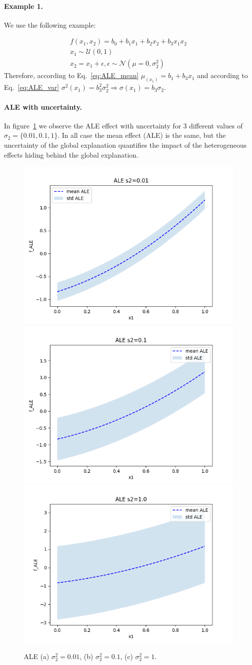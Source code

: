 \documentclass{article}
\begin{document}
\paragraph{Example 1.} We use the following example:

\begin{equation}
  \label{eq:model_1}
  \begin{gathered}
    f(x_1, x_2) = b_0 + b_1 x_1 + b_2 x_2 + b_3 x_1 x_2\\
    x_1 \sim \mathcal{U}(0,1) \\
    x_2 = x_1 + \epsilon, \epsilon \sim \mathcal{N}(\mu=0, \sigma_2^2)
  \end{gathered}
\end{equation}
%
Therefore, according to Eq.~\eqref{eq:ALE_mean}
\(\mu_(x_1) = b_1 + b_3 x_1\) and according to Eq.~\eqref{eq:ALE_var}
\(\sigma^2(x_1) = b_3^2 \sigma_2^2 \Rightarrow \sigma(x_1) = b_3
\sigma_2 \).

\paragraph{ALE with uncertainty.}

In figure~\ref{fig:bullet-1-im-3} we observe the ALE effect with
uncertainty for 3 different values of \(\sigma_2 = \{0.01, 0.1,
1\}\).
In all case the mean effect (ALE) is the same, but the
uncertainty of the global explanation quantifies the impact of the
heterogeneous effects hiding behind the global explanation.

\begin{figure}[!h]
  \centering
  \includegraphics[width=.32\linewidth]{./example_gromping_paper/ALE_gt_s2_0_01}
  \includegraphics[width=.32\linewidth]{./example_gromping_paper/ALE_gt_s2_0_1}
  \includegraphics[width=.32\linewidth]{./example_gromping_paper/ALE_gt_s2_1_0}
  \caption{ALE (a) \(\sigma_2^2 = 0.01\), (b) \(\sigma_2^2 = 0.1\), (c) \(\sigma_2^2 = 1.\)}
  \label{fig:bullet-1-im-3}
\end{figure}
\end{document}
